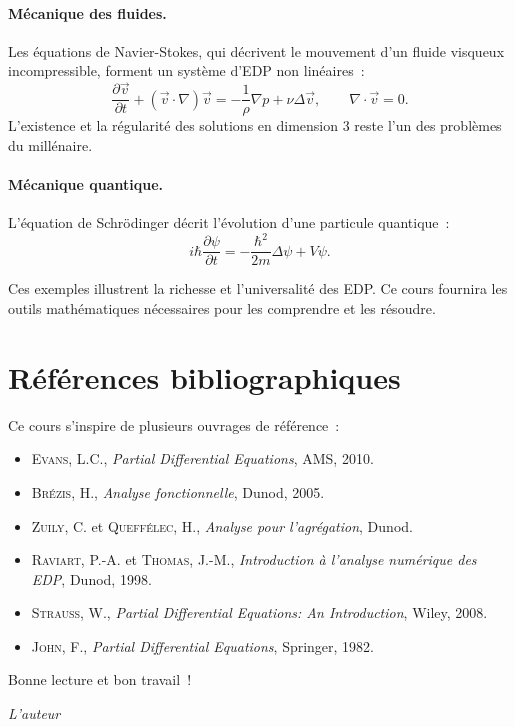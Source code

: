 \paragraph{M\'ecanique des fluides.}
Les \'equations de Navier-Stokes, qui d\'ecrivent le mouvement d'un fluide
visqueux incompressible, forment un syst\`eme d'EDP non lin\'eaires~:
\[
    \frac{\partial \vec{v}}{\partial t} + (\vec{v} \cdot \nabla)\vec{v}
    = -\frac{1}{\rho}\nabla p + \nu \Delta \vec{v}, \qquad
    \nabla \cdot \vec{v} = 0.
\]
L'existence et la r\'egularit\'e des solutions en dimension 3 reste l'un des
probl\`emes du mill\'enaire.

\paragraph{M\'ecanique quantique.}
L'\'equation de Schr\"odinger d\'ecrit l'\'evolution d'une particule quantique~:
\[
    i\hbar \frac{\partial \psi}{\partial t} = -\frac{\hbar^2}{2m}\Delta \psi + V\psi.
\]

Ces exemples illustrent la richesse et l'universalit\'e des EDP. Ce cours
fournira les outils math\'ematiques n\'ecessaires pour les comprendre et les
r\'esoudre.

\section*{R\'ef\'erences bibliographiques}

Ce cours s'inspire de plusieurs ouvrages de r\'ef\'erence~:
\begin{itemize}
    \item \textsc{Evans}, L.C., \emph{Partial Differential Equations}, AMS, 2010.
    \item \textsc{Br\'ezis}, H., \emph{Analyse fonctionnelle}, Dunod, 2005.
    \item \textsc{Zuily}, C. et \textsc{Queff\'elec}, H., \emph{Analyse pour
          l'agr\'egation}, Dunod.
    \item \textsc{Raviart}, P.-A. et \textsc{Thomas}, J.-M., \emph{Introduction
          \`a l'analyse num\'erique des EDP}, Dunod, 1998.
    \item \textsc{Strauss}, W., \emph{Partial Differential Equations: An Introduction},
          Wiley, 2008.
    \item \textsc{John}, F., \emph{Partial Differential Equations}, Springer, 1982.
\end{itemize}

\vspace{1cm}
\noindent
Bonne lecture et bon travail~!

\vspace{0.5cm}
\hfill\emph{L'auteur}
